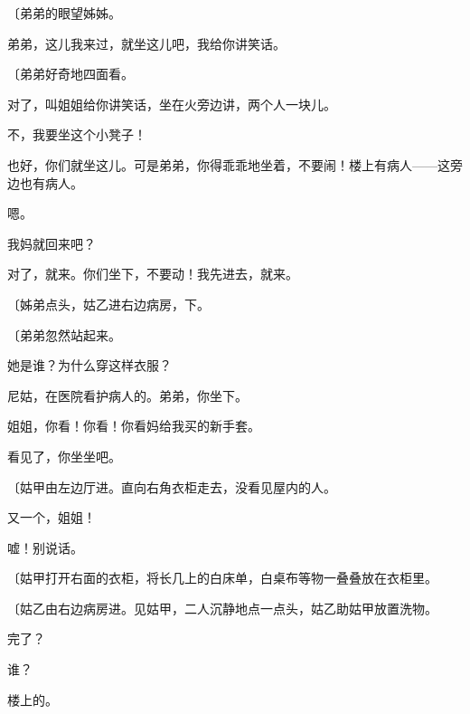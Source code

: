 {\fangsong〔弟弟的眼望姊姊。}

弟弟，这儿我来过，就坐这儿吧，我给你讲笑话。

{\fangsong〔弟弟好奇地四面看。}

对了，叫姐姐给你讲笑话，坐在火旁边讲，两个人一块儿。

不，我要坐这个小凳子！

也好，你们就坐这儿。可是弟弟，你得乖乖地坐着，不要闹！楼上有病人——这旁边也有病人。


\nobreak\quads[4]嗯。


我妈就回来吧？

对了，就来。你们坐下，不要动！我先进去，就来。

{\fangsong〔姊弟点头，姑乙进右边病房，下。}

{\fangsong〔弟弟忽然站起来。}

她是谁？为什么穿这样衣服？

尼姑，在医院看护病人的。弟弟，你坐下。

姐姐，你看！你看！你看妈给我买的新手套。

看见了，你坐坐吧。

{\fangsong〔姑甲由左边厅进。直向右角衣柜走去，没看见屋内的人。}

又一个，姐姐！

嘘！别说话。

{\fangsong〔姑甲打开右面的衣柜，将长几上的白床单，白桌布等物一叠叠放在衣柜里。}

{\fangsong〔姑乙由右边病房进。见姑甲，二人沉静地点一点头，姑乙助姑甲放置洗物。}

完了？

谁？

楼上的。

